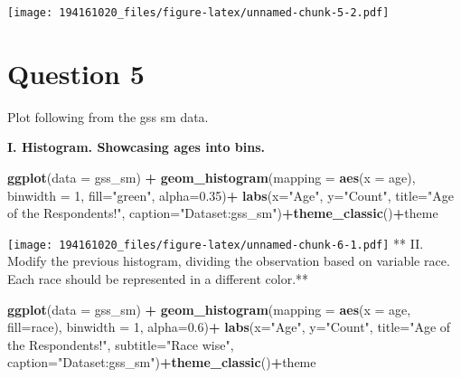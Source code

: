 \documentclass[
]{article}
\newenvironment{Shaded}{\begin{snugshade}}{\end{snugshade}}
\newcommand{\DataTypeTok}[1]{\textcolor[rgb]{0.13,0.29,0.53}{#1}}
\newcommand{\DecValTok}[1]{\textcolor[rgb]{0.00,0.00,0.81}{#1}}
\newcommand{\FloatTok}[1]{\textcolor[rgb]{0.00,0.00,0.81}{#1}}
\newcommand{\KeywordTok}[1]{\textcolor[rgb]{0.13,0.29,0.53}{\textbf{#1}}}
\newcommand{\NormalTok}[1]{#1}
\newcommand{\OperatorTok}[1]{\textcolor[rgb]{0.81,0.36,0.00}{\textbf{#1}}}
\newcommand{\StringTok}[1]{\textcolor[rgb]{0.31,0.60,0.02}{#1}}
\begin{document}
\texttt{[image: 194161020\_files/figure-latex/unnamed-chunk-5-2.pdf]}

\hypertarget{question-5}{%
\section{Question 5}\label{question-5}}

Plot following from the gss sm data.

\textbf{I. Histogram. Showcasing ages into bins.}

\begin{Shaded}
\begin{Highlighting}[]
\KeywordTok{ggplot}\NormalTok{(}\DataTypeTok{data =}\NormalTok{ gss_sm) }\OperatorTok{+}\StringTok{ }
\StringTok{  }\KeywordTok{geom_histogram}\NormalTok{(}\DataTypeTok{mapping =} \KeywordTok{aes}\NormalTok{(}\DataTypeTok{x =}\NormalTok{ age),}
                 \DataTypeTok{binwidth =} \DecValTok{1}\NormalTok{, }\DataTypeTok{fill=}\StringTok{"green"}\NormalTok{, }\DataTypeTok{alpha=}\FloatTok{0.35}\NormalTok{)}\OperatorTok{+}
\StringTok{  }\KeywordTok{labs}\NormalTok{(}\DataTypeTok{x=}\StringTok{"Age"}\NormalTok{, }\DataTypeTok{y=}\StringTok{"Count"}\NormalTok{, }
       \DataTypeTok{title=}\StringTok{"Age of the Respondents!"}\NormalTok{, }
       \DataTypeTok{caption=}\StringTok{"Dataset:gss_sm"}\NormalTok{)}\OperatorTok{+}\KeywordTok{theme_classic}\NormalTok{()}\OperatorTok{+}\NormalTok{theme}
\end{Highlighting}
\end{Shaded}

\texttt{[image: 194161020\_files/figure-latex/unnamed-chunk-6-1.pdf]} **
II. Modify the previous histogram, dividing the observation based on
variable race. Each race should be represented in a different color.**

\begin{Shaded}
\begin{Highlighting}[]
\KeywordTok{ggplot}\NormalTok{(}\DataTypeTok{data =}\NormalTok{ gss_sm) }\OperatorTok{+}\StringTok{ }
\StringTok{  }\KeywordTok{geom_histogram}\NormalTok{(}\DataTypeTok{mapping =} \KeywordTok{aes}\NormalTok{(}\DataTypeTok{x =}\NormalTok{ age, }\DataTypeTok{fill=}\NormalTok{race), }
                 \DataTypeTok{binwidth =} \DecValTok{1}\NormalTok{, }\DataTypeTok{alpha=}\FloatTok{0.6}\NormalTok{)}\OperatorTok{+}
\StringTok{  }\KeywordTok{labs}\NormalTok{(}\DataTypeTok{x=}\StringTok{"Age"}\NormalTok{, }\DataTypeTok{y=}\StringTok{"Count"}\NormalTok{, }\DataTypeTok{title=}\StringTok{"Age of the Respondents!"}\NormalTok{, }
       \DataTypeTok{subtitle=}\StringTok{"Race wise"}\NormalTok{, }\DataTypeTok{caption=}\StringTok{"Dataset:gss_sm"}\NormalTok{)}\OperatorTok{+}\KeywordTok{theme_classic}\NormalTok{()}\OperatorTok{+}\NormalTok{theme}
\end{Highlighting}
\end{Shaded}
\end{document}
